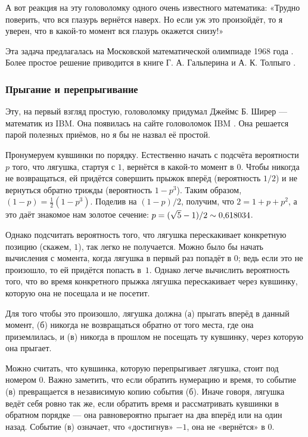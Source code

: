 А вот реакция на эту головоломку одного очень известного математика: «Трудно поверить, что вся глазурь вернётся наверх.
Но если уж это произойдёт, то я уверен, что в какой-то момент вся глазурь окажется снизу!»

\begin{addedbytheeditors}
Эта задача предлагалась на Московской математической олимпиаде 1968 года \cite[Задача 78676]{problems.ru}.
Более простое решение приводится в книге Г. А. Гальперина и А. К. Толпыго \cite[задача 31.27]{23}.
\pr
\end{addedbytheeditors}

\subsubsection*{Прыгание и перепрыгивание}

Эту, на первый взгляд простую, головоломку придумал Джеймс Б. Ширер --- математик из IBM.
Она появилась на сайте головоломок IBM \cite[апрель 2007]{ponder-this}.
Она решается парой полезных приёмов, но я бы не назвал её простой.

Пронумеруем кувшинки по порядку.
Естественно начать с подсчёта вероятности $p$ того, что лягушка, стартуя с $1$, вернётся в какой-то момент в $0$.
Чтобы никогда не возвращаться, ей придётся совершить прыжок вперёд (вероятность $1/2$) и не вернуться обратно трижды (вероятность $1 - p^3$).
Таким образом, $(1 - p) = \tfrac12(1 - p^3)$.
Поделив на $(1 - p)/2$, получим, что $2 = 1 + p + p^2$, а это даёт знакомое нам золотое сечение: $p = (\sqrt5 - 1)/2 \z\sim 0{,}618034$.

Однако подсчитать вероятность того, что лягушка перескакивает конкретную позицию (скажем, $1$), так легко не получается.
Можно было бы начать вычисления с момента, когда лягушка в первый раз попадёт в $0$; ведь если это не произошло, то ей придётся попасть в~$1$.
Однако легче вычислить вероятность того, что во время конкретного прыжка лягушка перескакивает через кувшинку, которую она  не посещала и не посетит.

Для того чтобы это произошло, лягушка должна
(а) прыгать вперёд в данный момент,
(б) никогда не возвращаться обратно от того места, где она приземлилась,
и (в) никогда в прошлом не посещать ту кувшинку, через которую она прыгает.

Можно считать, что кувшинка, которую перепрыгивает лягушка, стоит под номером 0.
Важно заметить, что если обратить нумерацию и время, то событие (в) превращается в независимую копию события (б).
Иначе говоря, лягушка ведёт себя ровно так же, если обратить время и рассматривать кувшинки в обратном порядке ---
она равновероятно прыгает на два вперёд или на один назад.
Событие (в) означает, что «достигнув» $-1$, она не «вернётся» в $0$.

